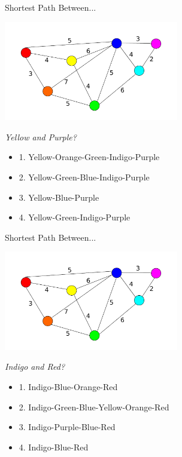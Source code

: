 \documentclass{beamer}
\begin{document}
\begin{frame}{Shortest Path Between...}
	\centerline{\includegraphics[width=3.0in]{weighted.pdf}}
	\textit{Yellow and Purple?}
        \begin{itemize}
	\item
		1. Yellow-Orange-Green-Indigo-Purple
	\item
		2. Yellow-Green-Blue-Indigo-Purple
	\item
		\alert{3. Yellow-Blue-Purple}
	\item
		4. Yellow-Green-Indigo-Purple
	\end{itemize}
\end{frame}

\begin{frame}{Shortest Path Between...}
	\centerline{\includegraphics[width=3.0in]{weighted.pdf}}
	\textit{Indigo and Red?}
        \begin{itemize}
	\item
		1. Indigo-Blue-Orange-Red
	\item
		2. Indigo-Green-Blue-Yellow-Orange-Red
	\item
		3. Indigo-Purple-Blue-Red
	\item
		4. Indigo-Blue-Red
	\end{itemize}
\end{frame}
\end{document}
